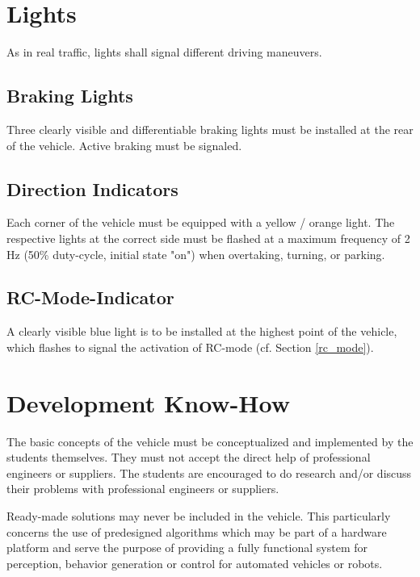 \section{Lights}

As in real traffic, lights shall signal different driving maneuvers.

\subsection{Braking Lights}

Three clearly visible and differentiable braking lights must be installed at
the rear of the vehicle. Active braking must be signaled.

\subsection{Direction Indicators}

Each corner of the vehicle must be equipped with a yellow / orange light. The
respective lights at the correct side must be flashed at a maximum frequency of
2 Hz (50\% duty-cycle, initial state "on") when overtaking, turning, or
parking.

\subsection{RC-Mode-Indicator}

A clearly visible blue light is to be installed at the highest point of the
vehicle, which flashes to signal the activation of RC-mode (cf. Section
\ref{rc_mode}).

\section{Development Know-How}
\label{dev_know_how}

The basic concepts of the vehicle must be conceptualized and implemented by the
students themselves. They must not accept the direct help of professional
engineers or suppliers. The students are encouraged to do research and/or
discuss their problems with professional engineers or suppliers.

Ready-made solutions may never be included in the vehicle. This particularly
concerns the use of predesigned algorithms which may be part of a hardware
platform and serve the purpose of providing a fully functional system for
perception, behavior generation or control for automated vehicles or robots.

